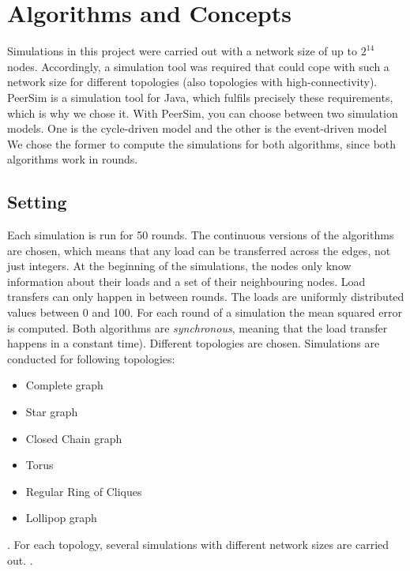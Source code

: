 \chapter{Algorithms and Concepts}\label{chap:background}


Simulations in this project were carried out with a network size of up to $2^{14}$ nodes. Accordingly, a simulation tool was required that could cope with such a network size for different topologies (also topologies with high-connectivity). PeerSim is a simulation tool for Java, which fulfils precisely these requirements, which is why we chose it. With PeerSim, you can choose between two simulation models. One is the cycle-driven model and the other is the event-driven model We chose the former to compute the simulations for both algorithms, since both algorithms work in rounds. 

\section{Setting}
Each simulation is run for 50 rounds. The continuous versions of the algorithms are chosen, which means that any load can be transferred across the edges, not just integers. At the beginning of the simulations, the nodes only know information about their loads and a set of their neighbouring nodes. Load transfers can only happen in between rounds. The loads are uniformly distributed values between 0 and 100. For each round of a simulation the mean squared error is computed. Both algorithms are \textit{synchronous}, meaning that the load transfer happens in a constant time). Different topologies are chosen. Simulations are conducted for following topologies:
\begin{itemize}
    \item Complete graph
    \item Star graph
    \item Closed Chain graph
    \item Torus
    \item Regular Ring of Cliques
    \item Lollipop graph
\end{itemize}
.
For each topology, several simulations with different network sizes are carried out. .



